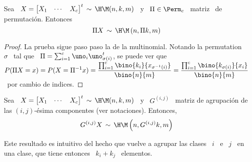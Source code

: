 \begin{lema}\label{Lem:MP:PermutacionHipergeomMulti}
%
  Sea  \ $X =  \begin{bmatrix} X_1  & \cdots  & X_c  \end{bmatrix}^t \,  \sim \,
  \H\M(n,k,m)$  \   y  \   $\Pi  \in  \Perm_c$   \  matriz   \  de
  permutaci\'on. Entonces
  \[
  \Pi X \, \sim \, \H\M\left( n ,  \Pi k , m \right)
  \]
\end{lema}
%
\begin{proof}
  La  prueba sigue  paso paso  la de  la multinomial.  Notando la  permutation \
  $\sigma$ \  tal que \ $\Pi  = \sum_{i=1}^c \uno_i  \uno_{\sigma(i)}^t$, se puede
  ver   que  \  $\displaystyle   P(\Pi  X   =  x)   =  P(X   =  \Pi^{-1}   x)  =
  \frac{\prod_{i=1}^c       \bino{k_i}{x_{\sigma^{-1}(i)}}}{\bino{n}{m}}       =
  \frac{\prod_{i=1}^c \bino{k_{\sigma(i)}}{x_i}}{\bino{n}{m}} $  \ por cambio de
  indices.
\end{proof}
%
\begin{lema}\label{Lem:MP:StabAgregacionHipergeomMulti}
%
  Sea  \ $X =  \begin{bmatrix} X_1  & \cdots  & X_c  \end{bmatrix}^t \,  \sim \,
  \H\M(n,k,m)$ \ y \ $G^{(i,j)}$ \ matriz de agrupaci\'on de las $(i,j)$-\'esima
  componentes (ver notaciones). Entonces,
  \[
  G^{(i,j)} X \, \sim \, \H\M\left( n , G^{(i,j)} k , m \right)  
  \]
\end{lema}
%
Este resultado es intuitivo del hecho que  vuelve a agrupar las clases \ $i$ \ e
\ $j$ \ en una clase, que tiene entonces \ $k_i + k_j$ \ elementos.
%

